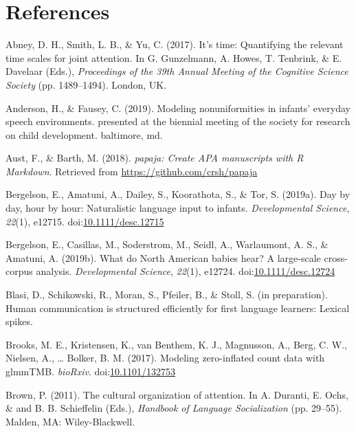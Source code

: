 \documentclass[,man,floatsintext]{apa6}
\begin{document}
\newpage

\section{References}\label{refs}

\begingroup
\setlength{\parindent}{-0.5in} \setlength{\leftskip}{0.5in}

\hypertarget{refs}{}
\hypertarget{ref-abney2017time}{}
Abney, D. H., Smith, L. B., \& Yu, C. (2017). It's time: Quantifying the
relevant time scales for joint attention. In G. Gunzelmann, A. Howes, T.
Tenbrink, \& E. Davelaar (Eds.), \emph{Proceedings of the 39th Annual
Meeting of the Cognitive Science Society} (pp. 1489--1494). London, UK.

\hypertarget{ref-anderson2019modeling}{}
Anderson, H., \& Fausey, C. (2019). Modeling nonuniformities in infants'
everyday speech environments. presented at the biennial meeting of the
society for research on child development. baltimore, md.

\hypertarget{ref-R-papaja}{}
Aust, F., \& Barth, M. (2018). \emph{papaja: Create APA manuscripts with
R Markdown}. Retrieved from \url{https://github.com/crsh/papaja}

\hypertarget{ref-bergelson2019day}{}
Bergelson, E., Amatuni, A., Dailey, S., Koorathota, S., \& Tor, S.
(2019a). Day by day, hour by hour: Naturalistic language input to
infants. \emph{Developmental Science}, \emph{22}(1), e12715.
doi:\href{https://doi.org/10.1111/desc.12715}{10.1111/desc.12715}

\hypertarget{ref-bergelsoncasillas2019what}{}
Bergelson, E., Casillas, M., Soderstrom, M., Seidl, A., Warlaumont, A.
S., \& Amatuni, A. (2019b). What do North American babies hear? A
large-scale cross-corpus analysis. \emph{Developmental Science},
\emph{22}(1), e12724.
doi:\href{https://doi.org/10.1111/desc.12724}{10.1111/desc.12724}

\hypertarget{ref-blasiIPhuman}{}
Blasi, D., Schikowski, R., Moran, S., Pfeiler, B., \& Stoll, S. (in
preparation). Human communication is structured efficiently for first
language learners: Lexical spikes.

\hypertarget{ref-brooks2017modeling}{}
Brooks, M. E., Kristensen, K., van Benthem, K. J., Magnusson, A., Berg,
C. W., Nielsen, A., \ldots{} Bolker, B. M. (2017). Modeling
zero-inflated count data with glmmTMB. \emph{bioRxiv}.
doi:\href{https://doi.org/10.1101/132753}{10.1101/132753}

\hypertarget{ref-brown2011cultural}{}
Brown, P. (2011). The cultural organization of attention. In A. Duranti,
E. Ochs, \& and B. B. Schieffelin (Eds.), \emph{Handbook of Language
Socialization} (pp. 29--55). Malden, MA: Wiley-Blackwell.
\end{document}
